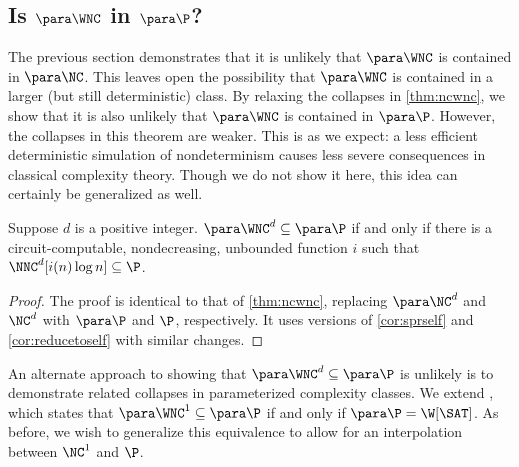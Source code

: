 \subsection{Is \texorpdfstring{$\para \WNC$}{paraWNC} in \texorpdfstring{$\para \P$}{paraP}?}
\label{sec:wncp}

%
%
%
The previous section demonstrates that it is unlikely that $\para \WNC$ is contained in $\para \NC$.
%
%
%
This leaves open the possibility that $\para \WNC$ is contained in a larger (but still deterministic) class.
%
%
%
%
%
%
%
%
%
%
%
By relaxing the collapses in \autoref{thm:ncwnc}, we show that it is also unlikely that $\para \WNC$ is contained in $\para \P$.
However, the collapses in this theorem are weaker.
%
%
%
This is as we expect: a less efficient deterministic simulation of nondeterminism causes less severe consequences in classical complexity theory.
%
%
Though we do not show it here, this idea can certainly be generalized as well.

\begin{theorem}\label{thm:wncp}
  Suppose $d$ is a positive integer.
  $\para \WNC^d \subseteq \para \P$ if and only if there is a circuit-computable, nondecreasing, unbounded function $i$ such that $\NNC^d[i(n) \log n] \subseteq \P$.
\end{theorem}
\begin{proof}
  The proof is identical to that of \autoref{thm:ncwnc}, replacing $\para \NC^d$ and $\NC^d$ with $\para \P$ and $\P$, respectively.
  It uses versions of \autoref{cor:sprself} and \autoref{cor:reducetoself} with similar changes.
\end{proof}

An alternate approach to showing that $\para \WNC^d \subseteq \para \P$ is unlikely is to demonstrate related collapses in parameterized complexity classes.
We extend \autocite[Corollary~3.8]{est15}, which states that $\para \WNC^1 \subseteq \para \P$ if and only if $\para \P = \W[\SAT]$.
As before, we wish to generalize this equivalence to allow for an interpolation between $\NC^1$ and $\P$.

